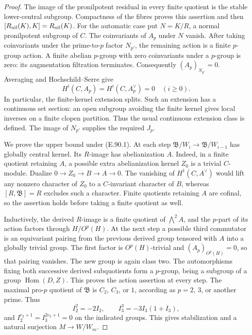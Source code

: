 \begin{proof}
The image of the pronilpotent residual in every finite quotient is
the stable lower-central subgroup.  Compactness of the fibres proves
this assertion and then \([R_{\rm nil}(K),K]=R_{\rm nil}(K)\).
For the automatic case put \(N=K/R\), a normal pronilpotent subgroup
of \(C\).  The coinvariants of \(A_p\) under \(N\) vanish.
After taking coinvariants under the prime-to-\(p\) factor \(N_{p'}\),
the remaining action is a finite \(p\)-group action.  A finite
abelian \(p\)-group with zero coinvariants under a \(p\)-group is
zero: its augmentation filtration terminates.  Consequently
\((A_p)_{N_{p'}}=0\).  Averaging and Hochschild--Serre give
\[
 H^i(C,A_p)=H^i(C,A_p^\vee)=0\quad(i\ge0).
                                                        \tag{E.90.5}
\]
In particular, the finite-kernel extension splits.  Such an
extension has a continuous set section: an open subgroup avoiding
the finite kernel gives local inverses on a finite clopen partition.
Thus the usual continuous extension class is defined.  The image
of \(N_{p'}\) supplies the required \(J_p\).

We prove the upper bound under (E.90.1).  At each step
\(\mathfrak B/W_i\to\mathfrak B/W_{i-1}\) has globally central
kernel.  Its \(R\)-image has abelianization \(A\).
Indeed, in a finite quotient retaining \(A\), a possible extra
abelianization kernel \(Z_0\) is a trivial \(C\)-module.  Dualize
\(0\to Z_0\to B\to A\to0\).
The vanishing of \(H^1(C,A^\vee)\) would lift any nonzero character
of \(Z_0\) to a \(C\)-invariant character of \(B\), whereas
\([R,\mathfrak B]=R\) excludes such a character.
Finite quotients retaining \(A\) are cofinal, so the assertion
holds before taking a finite quotient as well.

Inductively, the derived \(R\)-image is a finite quotient of
\(\bigwedge^2 A\), and the \(p\)-part of its action factors through
\(H/O^p(H)\).  At the next step a possible third commutator is an
equivariant pairing from the previous derived group tensored with
\(A\) into a globally trivial group.  The first factor is
\(O^p(H)\)-trivial and \((A_p)_{O^p(H)}=0\), so that pairing
vanishes.  The new group is again class two.  The automorphisms
fixing both successive derived subquotients form a \(p\)-group,
being a subgroup of a group \(\operatorname{Hom}(D,Z)\).
This proves the action assertion at every step.
The maximal pro-\(p\) quotient of \(\mathfrak B\) is \(C_2\),
\(C_3\), or \(1\), according as \(p=2\), \(3\), or another prime.
Thus
\[
 I_2^2=-2I_2,\qquad I_3^3=-3I_3(1+I_3),
\]
and \(I_2^{e_2+1}=I_3^{2e_3+1}=0\) on the indicated groups.
This gives stabilization and a natural surjection
\(M\to W/W_m\).


\end{proof}

